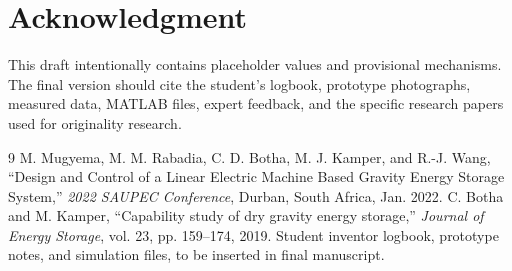 \documentclass[10.5pt]{article}
\begin{document}
\section*{Acknowledgment}
This draft intentionally contains placeholder values and provisional mechanisms. The final version should cite the student's logbook, prototype photographs, measured data, MATLAB files, expert feedback, and the specific research papers used for originality research.

\begin{thebibliography}{9}\small
{} M. Mugyema, M. M. Rabadia, C. D. Botha, M. J. Kamper, and R.-J. Wang, ``Design and Control of a Linear Electric Machine Based Gravity Energy Storage System,'' \textit{2022 SAUPEC Conference}, Durban, South Africa, Jan. 2022.
 C. Botha and M. Kamper, ``Capability study of dry gravity energy storage,'' \textit{Journal of Energy Storage}, vol. 23, pp. 159--174, 2019.
 Student inventor logbook, prototype notes, and simulation files, to be inserted in final manuscript.
\end{thebibliography}
\end{document}
